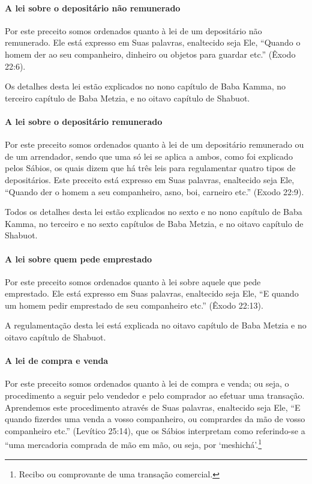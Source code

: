 \paragraph{A lei sobre o depositário não remunerado}

Por este preceito somos ordenados quanto à lei de um depositário não
remunerado. Ele está expresso em Suas palavras, enaltecido seja Ele,
``Quando o homem der ao seu companheiro, dinheiro ou objetos para
guardar etc.'' (Êxodo 22:6).

Os detalhes desta lei estão explicados no nono capítulo de Baba Kamma,
no terceiro capítulo de Baba Metzia, e no oitavo capítulo de Shabuot.

\paragraph{A lei sobre o depositário remunerado}

Por este preceito somos ordenados quanto à lei de um depositário
remunerado ou de um arrendador, sendo que uma só lei se aplica a ambos,
como foi explicado pelos Sábios, os quais dizem que há três leis para
regulamentar quatro tipos de depositários. Este preceito está expresso
em Suas palavras, enaltecido seja Ele, ``Quando der o homem a seu
companheiro, asno, boi, carneiro etc.'' (Exodo 22:9).

Todos os detalhes desta lei estão explicados no sexto e no nono
capítulo de Baba Kamma, no terceiro e no sexto capítulos de Baba
Metzia, e no oitavo capítulo de Shabuot.

\paragraph{A lei sobre quem pede emprestado}

Por este preceito somos ordenados quanto à lei sobre aquele que pede
emprestado. Ele está expresso em Suas palavras, enaltecido seja Ele, ``E
quando um homem pedir emprestado de seu companheiro etc.'' (Êxodo
22:13).

A regulamentação desta lei está explicada no oitavo capítulo de Baba
Metzia e no oitavo capítulo de Shabuot.

\paragraph{A lei de compra e venda}

Por este preceito somos ordenados quanto à lei de compra e venda; ou
seja, o procedimento a seguir pelo vendedor e pelo comprador ao efetuar
uma transação. Aprendemos este procedimento através de Suas palavras,
enaltecido seja Ele, ``E quando fizerdes uma venda a vosso companheiro,
ou comprardes da mão de vosso companheiro etc.'' (Levítico 25:14), que
os Sábios interpretam como referindo-se a ``uma mercadoria comprada de mão em mão,
ou seja, por `meshichá'.\footnote{Recibo ou comprovante de uma transação comercial.}

